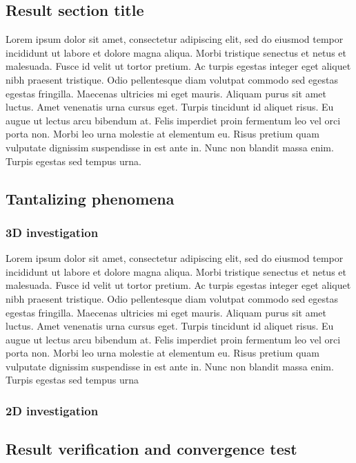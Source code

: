 \subsection{Result section title }

Lorem ipsum dolor sit amet, consectetur adipiscing elit, sed do eiusmod
tempor incididunt ut labore et dolore magna aliqua. Morbi tristique
senectus et netus et malesuada. Fusce id velit ut tortor pretium.
Ac turpis egestas integer eget aliquet nibh praesent tristique. Odio
pellentesque diam volutpat commodo sed egestas egestas fringilla.
Maecenas ultricies mi eget mauris. Aliquam purus sit amet luctus.
Amet venenatis urna cursus eget. Turpis tincidunt id aliquet risus.
Eu augue ut lectus arcu bibendum at. Felis imperdiet proin fermentum
leo vel orci porta non. Morbi leo urna molestie at elementum eu. Risus
pretium quam vulputate dignissim suspendisse in est ante in. Nunc
non blandit massa enim. Turpis egestas sed tempus urna. 

\subsection{Tantalizing phenomena}

\subsubsection{3D investigation}

Lorem ipsum dolor sit amet, consectetur adipiscing elit, sed do eiusmod
tempor incididunt ut labore et dolore magna aliqua. Morbi tristique
senectus et netus et malesuada. Fusce id velit ut tortor pretium.
Ac turpis egestas integer eget aliquet nibh praesent tristique. Odio
pellentesque diam volutpat commodo sed egestas egestas fringilla.
Maecenas ultricies mi eget mauris. Aliquam purus sit amet luctus.
Amet venenatis urna cursus eget. Turpis tincidunt id aliquet risus.
Eu augue ut lectus arcu bibendum at. Felis imperdiet proin fermentum
leo vel orci porta non. Morbi leo urna molestie at elementum eu. Risus
pretium quam vulputate dignissim suspendisse in est ante in. Nunc
non blandit massa enim. Turpis egestas sed tempus urna 

\subsubsection{2D investigation}

\subsection{Result verification and convergence test}

